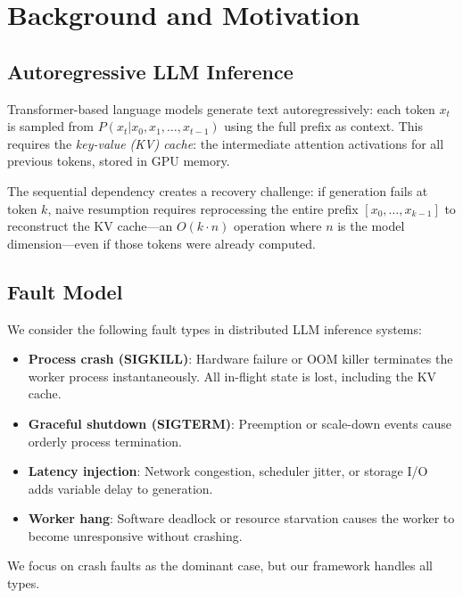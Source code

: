 \documentclass[10pt,twocolumn]{article}
\begin{document}
\section{Background and Motivation}
\label{sec:background}

\subsection{Autoregressive LLM Inference}

Transformer-based language models \cite{vaswani2017attention} generate text
autoregressively: each token $x_t$ is sampled from
$P(x_t | x_0, x_1, \ldots, x_{t-1})$ using the full prefix as context.
This requires the \textit{key-value (KV) cache}: the intermediate attention
activations for all previous tokens, stored in GPU memory.

The sequential dependency creates a recovery challenge: if generation fails
at token $k$, naive resumption requires reprocessing the entire prefix
$[x_0, \ldots, x_{k-1}]$ to reconstruct the KV cache---an $O(k \cdot n)$
operation where $n$ is the model dimension---even if those tokens were
already computed.

\subsection{Fault Model}

We consider the following fault types in distributed LLM inference systems:

\begin{itemize}[leftmargin=*,itemsep=2pt]
  \item \textbf{Process crash (SIGKILL)}: Hardware failure or OOM killer
    terminates the worker process instantaneously. All in-flight state is
    lost, including the KV cache.
  \item \textbf{Graceful shutdown (SIGTERM)}: Preemption or scale-down
    events cause orderly process termination.
  \item \textbf{Latency injection}: Network congestion, scheduler jitter,
    or storage I/O adds variable delay to generation.
  \item \textbf{Worker hang}: Software deadlock or resource starvation causes
    the worker to become unresponsive without crashing.
\end{itemize}

We focus on crash faults as the dominant case, but our framework handles
all types.
\end{document}
